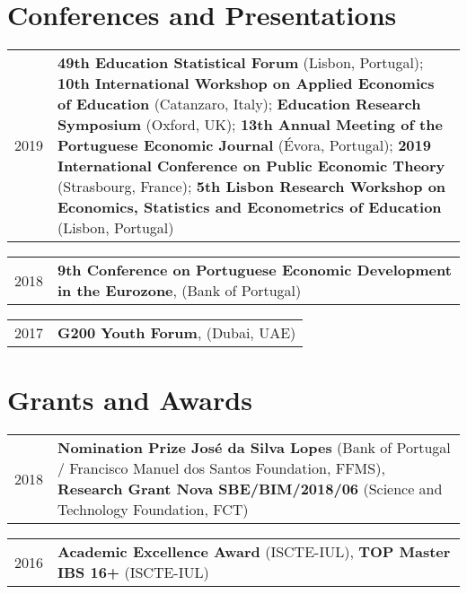 \documentclass[a4paper,11pt]{article} %
\begin{document}
\section[Conferences and Presentations]{\faCommentsO \hspace{3pt} Conferences and Presentations}

\begin{tabular}{r|p{13cm}}
	2019 & \textbf{49th Education Statistical Forum} (Lisbon, Portugal); \textbf{10th International Workshop on Applied Economics of Education} (Catanzaro, Italy); \textbf{Education Research Symposium} (Oxford, UK); \textbf{13th Annual Meeting of the Portuguese Economic Journal} (Évora, Portugal); \textbf{2019 International Conference on Public Economic Theory} (Strasbourg, France); \textbf{5th Lisbon Research Workshop on Economics, Statistics and Econometrics of Education} (Lisbon, Portugal)  \\
\end{tabular}


\begin{tabular}{r|p{13cm}}
	2018 & \textbf{9th Conference on Portuguese Economic Development in the Eurozone}, (Bank of Portugal)
\end{tabular}

\begin{tabular}{r|p{13cm}}
	2017 & \textbf{G200 Youth Forum}, (Dubai, UAE) \\
	
\end{tabular}

\section[Grants and Awards]{\faEuro \hspace{3pt} Grants and Awards}

\begin{tabular}{r|p{13cm}}
	2018 & \textbf{Nomination Prize José da Silva Lopes} (Bank of Portugal / Francisco Manuel dos Santos Foundation, FFMS), \textbf{Research Grant Nova SBE/BIM/2018/06} (Science and Technology Foundation, FCT) \\
\end{tabular}

\begin{tabular}{r|p{13cm}}
	2016 & \textbf{Academic Excellence Award} (ISCTE-IUL), \textbf{TOP Master IBS 16+} (ISCTE-IUL) \\
\end{tabular}
\end{document}
